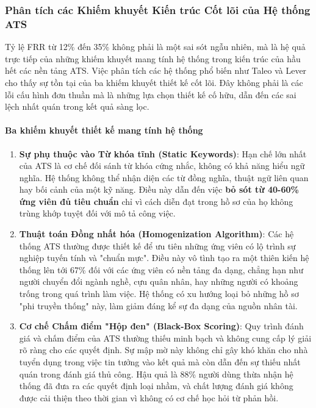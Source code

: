 \documentclass{article}
\begin{document}
\subsubsection{Phân tích các Khiếm khuyết Kiến trúc Cốt lõi của Hệ thống ATS}
Tỷ lệ FRR từ 12\% đến 35\% không phải là một sai sót ngẫu nhiên, mà là hệ quả trực tiếp của những khiếm khuyết mang tính hệ thống trong kiến trúc của hầu hết các nền tảng ATS. Việc phân tích các hệ thống phổ biến như Taleo và Lever cho thấy sự tồn tại của ba khiếm khuyết thiết kế cốt lõi. Đây không phải là các lỗi cấu hình đơn thuần mà là những lựa chọn thiết kế cố hữu, dẫn đến các sai lệch nhất quán trong kết quả sàng lọc.

\paragraph{Ba khiếm khuyết thiết kế mang tính hệ thống}
\begin{enumerate}[topsep=0pt, itemsep=0pt, leftmargin=40pt, label=\arabic*.]
    \item \textbf{Sự phụ thuộc vào Từ khóa tĩnh (Static Keywords)}: Hạn chế lớn nhất của ATS là cơ chế đối sánh từ khóa cứng nhắc, không có khả năng hiểu ngữ nghĩa. Hệ thống không thể nhận diện các từ đồng nghĩa, thuật ngữ liên quan hay bối cảnh của một kỹ năng. Điều này dẫn đến việc \textbf{bỏ sót từ 40-60\% ứng viên đủ tiêu chuẩn} chỉ vì cách diễn đạt trong hồ sơ của họ không trùng khớp tuyệt đối với mô tả công việc.
    \item \textbf{Thuật toán Đồng nhất hóa (Homogenization Algorithm)}: Các hệ thống ATS thường được thiết kế để ưu tiên những ứng viên có lộ trình sự nghiệp tuyến tính và "chuẩn mực". Điều này vô tình tạo ra một thiên kiến hệ thống lên tới 67\% đối với các ứng viên có nền tảng đa dạng, chẳng hạn như người chuyển đổi ngành nghề, cựu quân nhân, hay những người có khoảng trống trong quá trình làm việc. Hệ thống có xu hướng loại bỏ những hồ sơ "phi truyền thống" này, làm giảm đáng kể sự đa dạng của nguồn nhân tài.
    \item \textbf{Cơ chế Chấm điểm "Hộp đen" (Black-Box Scoring)}: Quy trình đánh giá và chấm điểm của ATS thường thiếu minh bạch và không cung cấp lý giải rõ ràng cho các quyết định. Sự mập mờ này không chỉ gây khó khăn cho nhà tuyển dụng trong việc tin tưởng vào kết quả mà còn dẫn đến sự thiếu nhất quán trong đánh giá thủ công. Hậu quả là 88\% người dùng thừa nhận hệ thống đã đưa ra các quyết định loại nhầm, và chất lượng đánh giá không được cải thiện theo thời gian vì không có cơ chế học hỏi từ phản hồi.
\end{enumerate}
\end{document}
